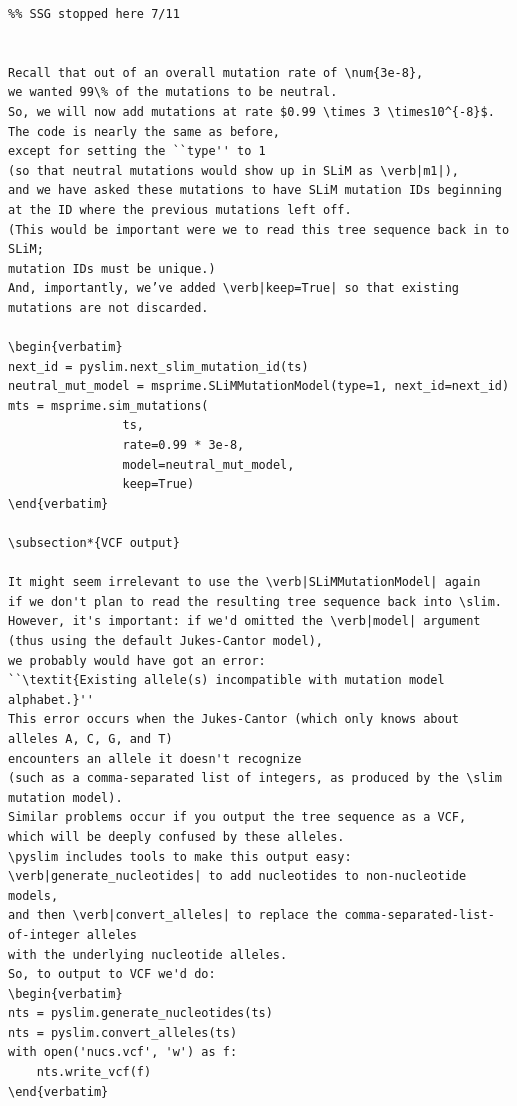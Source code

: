 \documentclass[12pt]{article}
\newcommand{\slim}[0]{\texttt{SLiM}\xspace}
\newcommand{\pyslim}[0]{\texttt{pyslim}\xspace}
\begin{document}
\begin{lstlisting}[language=slim]
%% if you simulated neutral mutations in your SLiM phase, you'd want to be careful about adding mutations again in this phase - you'd end up with 2x rate in the SLiM portion only
%% SSG stopped here 7/11


Recall that out of an overall mutation rate of \num{3e-8},
we wanted 99\% of the mutations to be neutral.
So, we will now add mutations at rate $0.99 \times 3 \times10^{-8}$.
The code is nearly the same as before,
except for setting the ``type'' to 1
(so that neutral mutations would show up in SLiM as \verb|m1|),
and we have asked these mutations to have SLiM mutation IDs beginning at the ID where the previous mutations left off.
(This would be important were we to read this tree sequence back in to SLiM;
mutation IDs must be unique.)
And, importantly, we’ve added \verb|keep=True| so that existing mutations are not discarded.
    
\begin{verbatim}
next_id = pyslim.next_slim_mutation_id(ts)
neutral_mut_model = msprime.SLiMMutationModel(type=1, next_id=next_id)
mts = msprime.sim_mutations(
                ts,
                rate=0.99 * 3e-8,
                model=neutral_mut_model,
                keep=True)
\end{verbatim}

\subsection*{VCF output}

It might seem irrelevant to use the \verb|SLiMMutationModel| again
if we don't plan to read the resulting tree sequence back into \slim.
However, it's important: if we'd omitted the \verb|model| argument
(thus using the default Jukes-Cantor model),
we probably would have got an error:
``\textit{Existing allele(s) incompatible with mutation model alphabet.}''
This error occurs when the Jukes-Cantor (which only knows about alleles A, C, G, and T)
encounters an allele it doesn't recognize
(such as a comma-separated list of integers, as produced by the \slim mutation model).
Similar problems occur if you output the tree sequence as a VCF,
which will be deeply confused by these alleles.
\pyslim includes tools to make this output easy:
\verb|generate_nucleotides| to add nucleotides to non-nucleotide models,
and then \verb|convert_alleles| to replace the comma-separated-list-of-integer alleles
with the underlying nucleotide alleles.
So, to output to VCF we'd do:
\begin{verbatim}
nts = pyslim.generate_nucleotides(ts)
nts = pyslim.convert_alleles(ts)
with open('nucs.vcf', 'w') as f:
    nts.write_vcf(f)
\end{verbatim}


\end{lstlisting}
\end{document}
